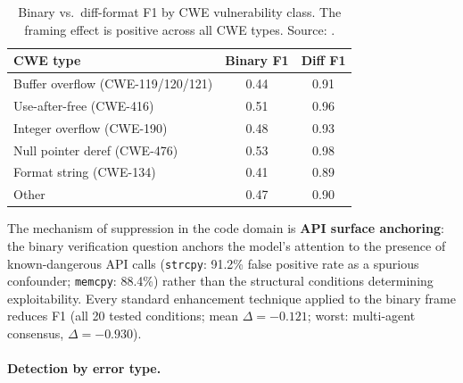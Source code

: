 \documentclass[11pt]{article}
\newcommand{\tighttable}{\setlength{\tabcolsep}{4pt}\renewcommand{\arraystretch}{1.05}}
\newcommand{\asa}{API surface anchoring}
\begin{document}
\begin{table}[H]
\centering\small\tighttable
\begin{tabular}{lcc}
\toprule
\textbf{CWE type} & \textbf{Binary F1} & \textbf{Diff F1} \\
\midrule
Buffer overflow (CWE-119/120/121) & 0.44 & 0.91 \\
Use-after-free (CWE-416)          & 0.51 & 0.96 \\
Integer overflow (CWE-190)        & 0.48 & 0.93 \\
Null pointer deref (CWE-476)      & 0.53 & 0.98 \\
Format string (CWE-134)           & 0.41 & 0.89 \\
Other                             & 0.47 & 0.90 \\
\bottomrule
\end{tabular}
\caption{Binary vs.\ diff-format F1 by CWE vulnerability class. The
framing effect is positive across all CWE types. Source:
\citep{tower2026vuln}.}
\label{tab:cwe}
\end{table}

The mechanism of suppression in the code domain is \textbf{\asa{}}:
the binary verification question anchors the model's attention to the
presence of known-dangerous API calls (\texttt{strcpy}: 91.2\% false
positive rate as a spurious confounder; \texttt{memcpy}: 88.4\%) rather
than the structural conditions determining exploitability. Every standard
enhancement technique applied to the binary frame reduces F1 (all 20
tested conditions; mean $\Delta = -0.121$; worst: multi-agent consensus,
$\Delta = -0.930$).

\paragraph{Detection by error type.}
\end{document}
